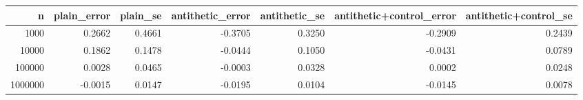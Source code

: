 \begin{tabular}{rrrrrrr}
\toprule
n & plain_error & plain_se & antithetic_error & antithetic_se & antithetic+control_error & antithetic+control_se \\
\midrule
1000 & 0.2662 & 0.4661 & -0.3705 & 0.3250 & -0.2909 & 0.2439 \\
10000 & 0.1862 & 0.1478 & -0.0444 & 0.1050 & -0.0431 & 0.0789 \\
100000 & 0.0028 & 0.0465 & -0.0003 & 0.0328 & 0.0002 & 0.0248 \\
1000000 & -0.0015 & 0.0147 & -0.0195 & 0.0104 & -0.0145 & 0.0078 \\
\bottomrule
\end{tabular}
